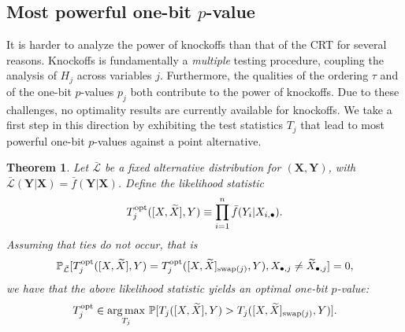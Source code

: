\documentclass[ejs]{imsart}
\numberwithin{equation}{section}
\theoremstyle{plain}
\newtheorem{theorem}{Theorem}[section]
\theoremstyle{definition}
\theoremstyle{remark}
\newcommand{\prx}{\bm X}
\newcommand{\srx}{X}
\newcommand{\srxk}{\widetilde X}
\newcommand{\pry}{{\bm Y}}
\newcommand{\sry}{Y}
\begin{document}
\subsection{Most powerful one-bit $p$-value}

It is harder to analyze the power of knockoffs than that of the CRT for several reasons. Knockoffs is fundamentally a \textit{multiple} testing procedure, coupling the analysis of $H_j$ across variables $j$. Furthermore, the qualities of the ordering $\tau$ and of the one-bit $p$-values $p_j$ both contribute to the power of knockoffs. Due to these challenges, no optimality results are currently available for knockoffs. We take a first step in this direction by exhibiting the test statistics $T_j$ that lead to most powerful one-bit $p$-values against a point alternative. 

\begin{theorem} \label{prop:knockoff-optimality}
	Let $\bar{\mathcal L}$ be a fixed alternative distribution for $(\prx,\pry)$, with $\bar{\mathcal L}(\pry|\prx) = \bar f(\pry|\prx)$. Define the likelihood statistic
	\begin{equation}
	T_j^{\textnormal{opt}}([\srx, \srxk], \sry) \equiv \prod_{i = 1}^n\bar f(\sry_i|\srx_{i,\bullet}).
	\label{log-likelihood-ratio-knockoffs}
	\end{equation}
	Assuming that ties do not occur, that is
	\begin{equation}
	\mathbb P_{\bar {\mathcal L}}[T^{\textnormal{opt}}_j([\srx, \srxk], \sry) = T^{\textnormal{opt}}_j([\srx, \srxk]_{\textnormal{swap}(j)}, \sry), \srx_{\bullet, j} \neq \srxk_{\bullet, j}] = 0, 
	\label{nondegeneracy-assumption}
	\end{equation}
	we have that the above likelihood statistic yields an optimal one-bit $p$-value:
	\begin{equation}
	T_j^{\textnormal{opt}} \in \underset{T_j}{\arg \max}\ \mathbb P[T_j([\srx, \srxk], \sry) > T_j([\srx, \srxk]_{\textnormal{swap}(j)}, \sry)].
	\label{unconditional-knockoff-optimality}
	\end{equation}
\end{theorem}
\end{document}
